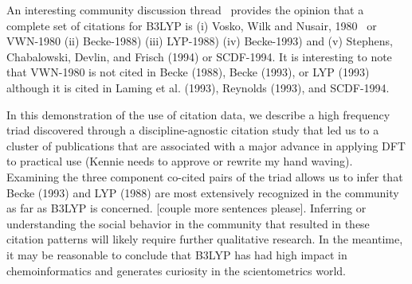 \documentclass[11pt, oneside]{article}   	%
\begin{document}
An interesting community discussion thread~\citep{johansson2002} provides the opinion that a complete set of citations for B3LYP is (i) Vosko, Wilk and Nusair, 1980~\citep{vosko1980accurate} or VWN-1980 (ii) Becke-1988) (iii) LYP-1988) (iv) Becke-1993) and (v) Stephens, Chabalowski, Devlin, and Frisch (1994) or SCDF-1994. It is interesting to note that VWN-1980  is not cited in Becke (1988), Becke (1993), or LYP (1993) although it is cited in Laming et al. (1993), Reynolds (1993), and SCDF-1994.

In this demonstration of the use of citation data, we describe a high frequency triad discovered through a discipline-agnostic citation study that led us to a cluster of publications that are associated with a major advance in applying DFT to practical use (Kennie needs to approve or rewrite my hand waving). Examining the three component co-cited pairs of the triad allows us to infer that Becke (1993) and LYP (1988) are most extensively recognized in the community as far as B3LYP is concerned. [couple more sentences please]. Inferring or understanding the social behavior in the community that resulted in these citation patterns will likely require further qualitative research. In the meantime, it may be reasonable to conclude that B3LYP has had high impact in chemoinformatics and generates curiosity in the scientometrics world.



\end{document}
